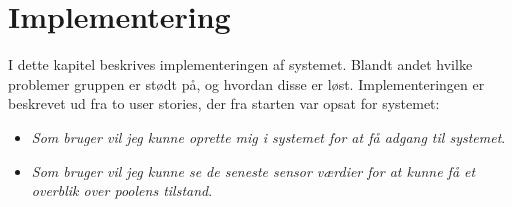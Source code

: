 \chapter{Implementering}

I dette kapitel beskrives implementeringen af systemet. Blandt andet hvilke problemer gruppen er stødt på, og hvordan disse er løst. 
Implementeringen er beskrevet ud fra to user stories, der fra starten var opsat for systemet:

\begin{itemize}
	\item \textit{Som bruger vil jeg kunne oprette mig i systemet for at få adgang til systemet}.
	\item \textit{Som bruger vil jeg kunne se de seneste sensor værdier for at kunne få et overblik over poolens tilstand}.
\end{itemize}



